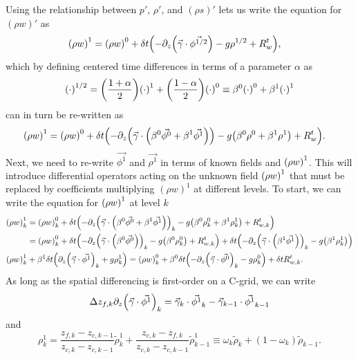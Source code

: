 \documentclass[11pt]{article}
\begin{document}
Using the relationship between $p'$, $\rho'$, and $(\rho s)'$ lets us write the equation for $(\rho w)'$ as
\begin{align*}
\qty(\rho w)^1 &= \qty(\rho w)^0 + \delta t \qty(-\partial_z \qty(\vec{\gamma} \cdot \vec{\phi^{1/2}}) - g \rho^{1/2} + R_w^t),
\end{align*}
which by defining centered time differences in terms of a parameter $\alpha$ as
\begin{equation*}
\qty(\cdot)^{1/2} = \qty(\frac{1 + \alpha}{2}) \qty(\cdot)^1 + \qty(\frac{1 - \alpha}{2}) \qty(\cdot)^0 \equiv \beta^0 \qty(\cdot)^0 + \beta^1 \qty(\cdot)^1
\end{equation*}
can in turn be re-written as
\begin{align*}
\qty(\rho w)^1 &= \qty(\rho w)^0 + \delta t \qty(-\partial_z \qty(\vec{\gamma} \cdot \qty(\beta^0\vec{\phi^0} + \beta^1 \vec{\phi^1})) - g \qty(\beta^0 \rho^0 + \beta^1 \rho^1) + R_w^t).
\end{align*}
Next, we need to re-write $\vec{\phi^1}$ and $\vec{\rho^1}$ in terms of known fields and $\qty(\rho w)^1$. This will introduce differential operators acting on the unknown field $\qty(\rho w)^1$ that must be replaced by coefficients multiplying $(\rho w)^1$ at different levels. To start, we can write the equation for $\qty(\rho w)^1$ at level $k$
\begin{align*}
\qty(\rho w)^1_k &= \qty(\rho w)^0_k + \delta t \qty(-\partial_z \qty(\vec{\gamma} \cdot \qty(\beta^0\vec{\phi^0} + \beta^1 \vec{\phi^1}))_k - g \qty(\beta^0 \rho^0_k + \beta^1 \rho^1_k) + R_{w,k}^t) \\
&= \qty(\rho w)^0_k + \delta t \qty(-\partial_z \qty(\vec{\gamma} \cdot \qty(\beta^0\vec{\phi^0} ))_k - g \qty(\beta^0 \rho^0_k) + R_{w,k}^t) + \delta t \qty(-\partial_z \qty(\vec{\gamma} \cdot \qty(\beta^1 \vec{\phi^1}))_k - g \qty(\beta^1 \rho^1_k)) \\
\qty(\rho w)^1_k &+ \beta^1 \delta t \qty(\partial_z \qty(\vec{\gamma} \cdot \vec{\phi^1})_k + g \rho^1_k) = \qty(\rho w)^0_k + \beta^0 \delta t \qty(-\partial_z \qty(\vec{\gamma} \cdot \vec{\phi^0} )_k - g \rho^0_k) + \delta t R_{w,k}^t.
\end{align*}
As long as the spatial differencing is first-order on a C-grid, we can write
\begin{equation*}
\Delta z_{f,k} \partial_z \qty (\vec{\gamma} \cdot \vec{\phi^1})_k = \vec{\gamma}_k \cdot \vec{\phi^1}_k - \vec{\gamma}_{k-1} \cdot \vec{\phi^1}_{k-1}
\end{equation*}
and
\begin{equation*}
\rho_k^1 = \frac{z_{f,k} - z_{c,k-1}}{z_{c,k} - z_{c,k-1}}\tilde{\rho}_k^1 + \frac{z_{c,k} - z_{f,k}}{z_{c,k} - z_{c,k-1}}\tilde{\rho}_{k-1}^1 \equiv \omega_k \tilde{\rho}_k + (1 - \omega_k) \tilde{\rho}_{k-1}.
\end{equation*}
\end{document}
